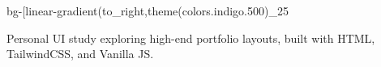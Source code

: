 bg-[linear-gradient(to_right,theme(colors.indigo.500)_25%

Personal UI study exploring high-end portfolio layouts, built with HTML, TailwindCSS, and Vanilla JS.